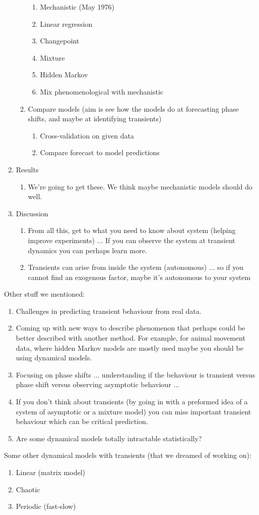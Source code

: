 \documentclass[11pt,letter]{article}
\begin{document}
\begin{enumerate}
\begin{enumerate}
\begin{enumerate}
\item Mechanistic (May 1976) %
\item Linear regression
\item Changepoint
\item Mixture 
\item Hidden Markov %
\item Mix phenomenological with mechanistic
\end{enumerate}
\item Compare models (aim is see how the models do at forecasting phase shifts, and maybe at identifying transients)
\begin{enumerate}
\item Cross-validation on given data
\item Compare forecast to model predictions
\end{enumerate}
\end{enumerate}
\item Results
\begin{enumerate}
\item We're going to get these. We think maybe mechanistic models should do well.
\end{enumerate}
\item Discussion
\begin{enumerate}
\item From all this, get to what you need to know about system (helping improve experiments)  ... If you can observe the system at transient dynamics you can perhaps learn more. 
\item Transients can arise from inside the system (autonomous) ... so if you cannot find an exogenous factor, maybe it's autonomous to your system
\end{enumerate}
\end{enumerate}


Other stuff we mentioned:
\begin{enumerate}
\item Challenges in predicting transient behaviour from real data.
\item Coming up with new ways to describe phenomenon that perhaps could be better described with another method. For example, for animal movement data, where hidden Markov models are mostly used maybe you should be using dynamical models.
\item Focusing on phase shifts ... understanding if the behaviour is transient versus phase shift versus observing asymptotic behaviour ... 
\item If you don't think about transients (by going in with a preformed idea of a system of asymptotic or a mixture model) you can miss important transient behaviour which can be critical prediction.
\item Are some dynamical models totally intractable statistically?
\end{enumerate}


Some other dynamical models with transients (that we dreamed of working on):
\begin{enumerate}
\item Linear (matrix model) 
\item Chaotic
\item Periodic (fast-slow)
\end{enumerate}
\end{document}
